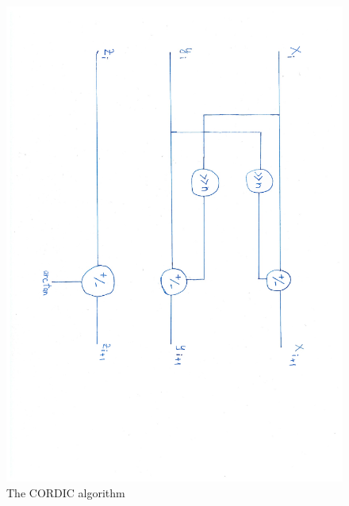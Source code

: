 \documentclass[12pt, a4paper,oneside]{article}
\begin{document}
\begin{figure}[h]
	\centering
	\includegraphics[width = \linewidth,angle=90]{cordic_dfg.pdf}
	\caption{The CORDIC algorithm}
	\label{fig:cordic_algorithm}
\end{figure}

\printbibliography
\end{document}
